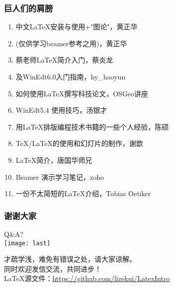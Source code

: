 \begin{frame}
  \frametitle{巨人们的肩膀}
  \begin{enumerate}
    \item 中文\LaTeX{}安装与使用+"图论"，\textcolor[rgb]{0.50,0.50,1.00}{黄正华}
    \item (仅供学习beamer参考之用)，\textcolor[rgb]{0.50,0.50,1.00}{黄正华}
    \item 蔡老师\LaTeX{}简介入门，\textcolor[rgb]{0.50,0.50,1.00}{蔡炎龙}
    \item \XeLaTeX{}及WinEdt6.0入门指南，\textcolor[rgb]{0.50,0.50,1.00}{hy\_haoyun}
    \item 如何使用\LaTeX{}撰写科技论文，\textcolor[rgb]{0.50,0.50,1.00}{OSGeo讲座}
    \item WinEdt5.4 使用技巧，\textcolor[rgb]{0.50,0.50,1.00}{汤银才}
    \item 用\LaTeX{}排版编程技术书籍的一些个人经验，\textcolor[rgb]{0.50,0.50,1.00}{陈硕}
    \item \TeX{}/\LaTeX{}的使用和幻灯片的制作，\textcolor[rgb]{0.50,0.50,1.00}{谢歆}
    \item \LaTeX{}简介，\textcolor[rgb]{0.50,0.50,1.00}{唐国华师兄}
    \item Beamer 演示学习笔记，\textcolor[rgb]{0.50,0.50,1.00}{zoho}
    \item 一份不太简短的\LaTeX{}介绍，\textcolor[rgb]{0.50,0.50,1.00}{Tobias Oetiker}
  \end{enumerate}
\end{frame}

\begin{frame}
  \frametitle{谢谢大家}
  \begin{center}
    \Huge Q\&A?\\
    \texttt{[image: last]}
  \end{center}
  \begin{center}
    才疏学浅，难免有错误之处，请大家谅解。\\同时欢迎发信交流，共同进步！\\
    \footnotesize{\LaTeX{}源文件：\url{https://github.com/lizekui/LatexIntro}}
  \end{center}
\end{frame}
